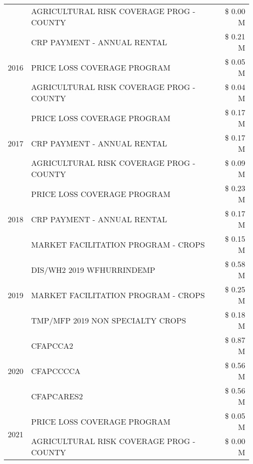\begin{tabular}{llr}
 & AGRICULTURAL RISK COVERAGE PROG - COUNTY & \$ 0.00 M \\
\cline{1-3}
\multirow[t]{3}{*}{2016} & CRP PAYMENT - ANNUAL RENTAL & \$ 0.21 M \\
 & PRICE LOSS COVERAGE PROGRAM & \$ 0.05 M \\
 & AGRICULTURAL RISK COVERAGE PROG - COUNTY & \$ 0.04 M \\
\cline{1-3}
\multirow[t]{3}{*}{2017} & PRICE LOSS COVERAGE PROGRAM & \$ 0.17 M \\
 & CRP PAYMENT - ANNUAL RENTAL & \$ 0.17 M \\
 & AGRICULTURAL RISK COVERAGE PROG - COUNTY & \$ 0.09 M \\
\cline{1-3}
\multirow[t]{3}{*}{2018} & PRICE LOSS COVERAGE PROGRAM & \$ 0.23 M \\
 & CRP PAYMENT - ANNUAL RENTAL & \$ 0.17 M \\
 & MARKET FACILITATION PROGRAM - CROPS & \$ 0.15 M \\
\cline{1-3}
\multirow[t]{3}{*}{2019} & DIS/WH2 2019 WFHURRINDEMP & \$ 0.58 M \\
 & MARKET FACILITATION PROGRAM - CROPS & \$ 0.25 M \\
 & TMP/MFP 2019 NON SPECIALTY CROPS & \$ 0.18 M \\
\cline{1-3}
\multirow[t]{3}{*}{2020} & CFAPCCA2 & \$ 0.87 M \\
 & CFAPCCCCA & \$ 0.56 M \\
 & CFAPCARES2 & \$ 0.56 M \\
\cline{1-3}
\multirow[t]{2}{*}{2021} & PRICE LOSS COVERAGE PROGRAM & \$ 0.05 M \\
 & AGRICULTURAL RISK COVERAGE PROG - COUNTY & \$ 0.00 M \\
\cline{1-3}
\bottomrule
\end{tabular}
